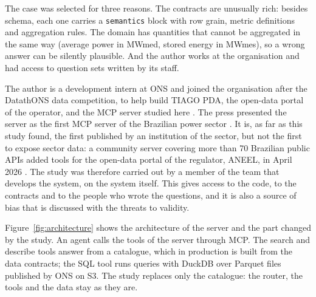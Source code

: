 The case was selected for three reasons. The contracts are unusually rich: besides schema,
each one carries a \texttt{semantics} block with row grain, metric definitions and
aggregation rules. The domain has quantities that cannot be aggregated in the same way
(average power in MWmed, stored energy in MWmes), so a wrong answer can be silently
plausible. And the author works at the organisation and had access to question sets written
by its staff.

The author is a development intern at ONS and joined the organisation after the DatathONS
data competition, to help build TIAGO PDA, the open-data portal of the operator, and the MCP
server studied here \cite{baguete2026ons}. The press presented the server as the first MCP
server of the Brazilian power sector \cite{baguete2026ons}. It is, as far as this study
found, the first published by an institution of the sector, but not the first to expose
sector data: a community server covering more than 70 Brazilian public APIs added tools for
the open-data portal of the regulator, ANEEL, in April 2026 \cite{mcpbrasil2026}. The study was therefore carried out by a member of the team that
develops the system, on the system itself. This gives access to the code, to the contracts
and to the people who wrote the questions, and it is also a source of bias that is discussed
with the threats to validity.

Figure~\ref{fig:architecture} shows the architecture of the server and the part changed by
the study. An agent calls the tools of the server through MCP. The search and describe tools
answer from a catalogue, which in production is built from the data contracts; the SQL tool
runs queries with DuckDB over Parquet files published by ONS on S3. The study replaces only
the catalogue: the router, the tools and the data stay as they are.

